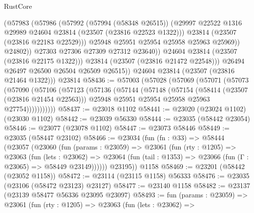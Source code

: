 \begin{lexlean}{RustCore}
\begin{coremodule}
                      (@57983
                        (@57986
                          (@57992
                            (@57994 (@58348 @26515))
                            (@29997
                              @22522
                              @1316
                              @29989
                              @24604
                              @23814
                              (@23507 (@23816 @22523 @1322)))
                            @23814
                            (@23507 (@23816 @22183 @22529)))
                          @25948
                          @25951
                          @25954
                          @25958
                          @25963
                          @25969))
                      @24802))
                  @27303
                  @27306
                  @27309
                  @27312
                  @23640))
              @24604
              @23814
              (@23507 (@23816 @22175 @1322)))
            @23814
            (@23507 (@23816 @21472 @22548)))
          @26494
          @26497
          @26500
          @26504
          @26509
          @26515))
      @24604
      @23814
      (@23507 (@23816 @21464 @1322)))
    @23814
@58436 := @57003
    (@57028
      (@57069
        (@57071
          (@57073
            (@57090
              (@57106
                (@57123
                  (@57136
                    (@57144
                      (@57148
                        (@57154
                          (@58414 (@23507 (@23816 @21454 @22563)))
                          @25948
                          @25951
                          @25954
                          @25958
                          @25963
                          @27754)))))))))))
@58437 := @23018 @1102
@58441 := @23020 (@23024 @1102) (@23030 @1102)
@58442 := @23039 @56330
@58444 := @23035 (@58442 @23054)
@58446 := @23077 (@23078 @1102)
@58447 := @23073 @58446
@58449 := @23035 (@58447 @23102)
@58466 := @23034
    (fun (fn : @33) =>
    @58444
      (@23057
        (@23060
          (fun (params : @23059) =>
          @23061
            (fun (rty : @1205) =>
            @23063
              (fun (lets : @23062) =>
              @23064 (fun (tail : @1353) => @23066 (fun (Γ : @23065) => @58449 @23149))))))
        @23195))
    @1158
@58469 := @23201 (@58442 (@23052 @1158))
@58472 := @23114 (@23115 @1158) @56333
@58476 := @23035 (@23106 (@58472 @23123) @23127)
@58477 := @23140 @1158
@58482 := @23137 (@23139 @58477 @56336 @23095 @23097)
@58493 := fun (params : @23059) =>
  @23061
    (fun (rty : @1205) =>
    @23063
      (fun (lets : @23062) =>

\end{coremodule}
\end{lexlean}
